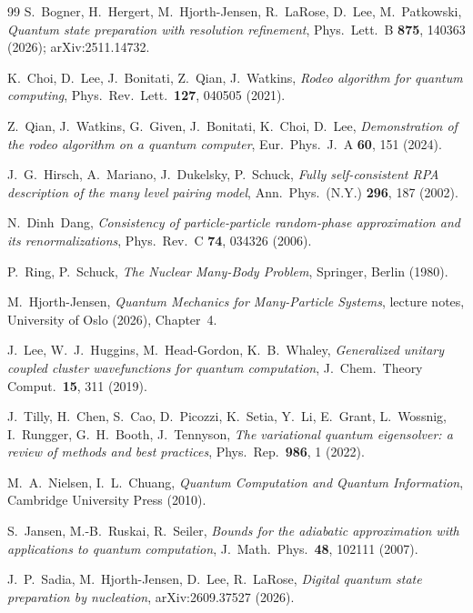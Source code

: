 \documentclass[
  aps,            %
  prc,            %
  reprint,        %
  superscriptaddress,
  floatfix,
  nofootinbib
]{revtex4-2}
\begin{document}
\begin{thebibliography}{99}
S.~Bogner, H.~Hergert, M.~Hjorth-Jensen, R.~LaRose, D.~Lee, M.~Patkowski,
\textit{Quantum state preparation with resolution refinement},
Phys.\ Lett.\ B \textbf{875}, 140363 (2026); arXiv:2511.14732.

K.~Choi, D.~Lee, J.~Bonitati, Z.~Qian, J.~Watkins,
\textit{Rodeo algorithm for quantum computing},
Phys.\ Rev.\ Lett.\ \textbf{127}, 040505 (2021).

Z.~Qian, J.~Watkins, G.~Given, J.~Bonitati, K.~Choi, D.~Lee,
\textit{Demonstration of the rodeo algorithm on a quantum computer},
Eur.\ Phys.\ J.\ A \textbf{60}, 151 (2024).

J.~G.~Hirsch, A.~Mariano, J.~Dukelsky, P.~Schuck,
\textit{Fully self-consistent RPA description of the many level pairing model},
Ann.\ Phys.\ (N.Y.) \textbf{296}, 187 (2002).

N.~Dinh~Dang,
\textit{Consistency of particle-particle random-phase approximation and its
renormalizations},
Phys.\ Rev.\ C \textbf{74}, 034326 (2006).

P.~Ring, P.~Schuck,
\textit{The Nuclear Many-Body Problem},
Springer, Berlin (1980).

M.~Hjorth-Jensen,
\textit{Quantum Mechanics for Many-Particle Systems},
lecture notes, University of Oslo (2026), Chapter~4.

J.~Lee, W.~J.~Huggins, M.~Head-Gordon, K.~B.~Whaley,
\textit{Generalized unitary coupled cluster wavefunctions for quantum computation},
J.\ Chem.\ Theory Comput.\ \textbf{15}, 311 (2019).

J.~Tilly, H.~Chen, S.~Cao, D.~Picozzi, K.~Setia, Y.~Li, E.~Grant, L.~Wossnig,
I.~Rungger, G.~H.~Booth, J.~Tennyson,
\textit{The variational quantum eigensolver: a review of methods and best
practices},
Phys.\ Rep.\ \textbf{986}, 1 (2022).

M.~A.~Nielsen, I.~L.~Chuang,
\textit{Quantum Computation and Quantum Information},
Cambridge University Press (2010).

S.~Jansen, M.-B.~Ruskai, R.~Seiler,
\textit{Bounds for the adiabatic approximation with applications to quantum
computation},
J.\ Math.\ Phys.\ \textbf{48}, 102111 (2007).

J.~P.~Sadia, M.~Hjorth-Jensen, D.~Lee, R.~LaRose,
\textit{Digital quantum state preparation by nucleation},
arXiv:2609.37527 (2026).


\end{thebibliography}
\end{document}
